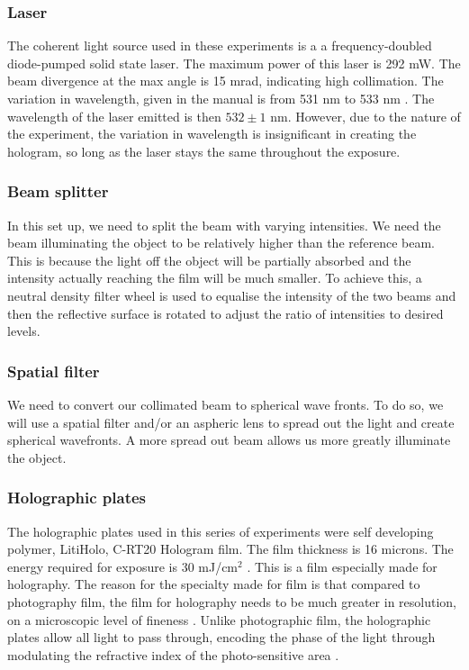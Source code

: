 \documentclass[aps,prl,reprint,10pt,amsmath,amssymb,superscriptaddress,a4paper]{revtex4-2}
\begin{document}
\subsubsection{Laser}
The coherent light source used in these experiments is a a frequency-doubled diode-pumped solid state laser. The maximum power of this laser is 292 mW. The 
beam divergence at the max angle is 15 mrad, indicating high collimation. The variation in wavelength, given in the manual is from 531 nm to 533 nm \citep{thorlabs}.
The wavelength of the laser emitted is then $532 \pm 1$ nm. However, due to the nature of the experiment, the variation in wavelength is insignificant in 
creating the hologram, so long as the laser stays the same throughout the exposure.

\subsubsection{Beam splitter}
In this set up, we need to split the beam with varying intensities. We need the beam illuminating the object to be relatively higher than the reference beam. This is because 
the light off the object will be partially absorbed and the intensity actually reaching the film will be much smaller. To achieve this, a neutral density filter wheel is used 
to equalise the intensity of the two beams and then the reflective surface is rotated to adjust the ratio of intensities to desired levels.

\subsubsection{Spatial filter}
We need to convert our collimated beam to spherical wave fronts. To do so, we will use a spatial filter and/or an aspheric lens to spread out the light and create spherical 
wavefronts. A more spread out beam allows us more greatly illuminate the object.

\subsubsection{Holographic plates}
The holographic plates used in this series of experiments were self developing polymer, LitiHolo, C-RT20 Hologram film. The film thickness is 16 microns. The energy required for 
exposure is 30 mJ/cm$^2$ \citep{litiholo}. This is a film especially made for holography. The reason for the specialty made for film is that compared to photography film, the 
film for holography needs to be much greater in resolution, on a microscopic level of fineness \citep{kasper}. Unlike photographic film, the holographic plates allow all light to pass 
through, encoding the phase of the light through modulating the refractive index of the photo-sensitive area \citep{ioka}.
\end{document}
